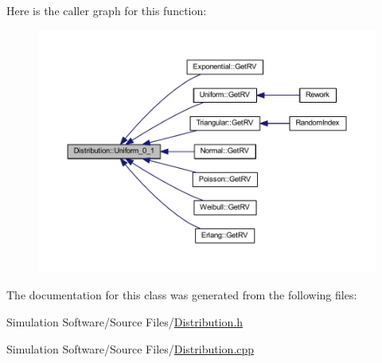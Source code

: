 Here is the caller graph for this function\+:\nopagebreak
\begin{figure}[H]
\begin{center}
\leavevmode
\includegraphics[width=350pt]{class_distribution_a33965648e4c6d3bbc93c61ccd3897c98_icgraph}
\end{center}
\end{figure}


The documentation for this class was generated from the following files\+:\begin{DoxyCompactItemize}
\item 
Simulation Software/\+Source Files/\hyperlink{_distribution_8h}{Distribution.\+h}\item 
Simulation Software/\+Source Files/\hyperlink{_distribution_8cpp}{Distribution.\+cpp}\end{DoxyCompactItemize}
